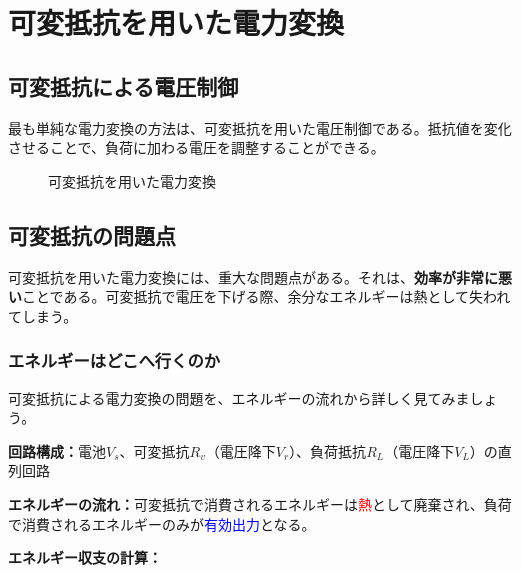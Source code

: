 \section{可変抵抗を用いた電力変換}

\subsection{可変抵抗による電圧制御}

最も単純な電力変換の方法は、可変抵抗を用いた電圧制御である。抵抗値を変化させることで、負荷に加わる電圧を調整することができる。

\begin{figure}[H]
\centering
{}
\caption{可変抵抗を用いた電力変換}
\label{fig:variable_resistor}
\end{figure}

\subsection{可変抵抗の問題点}

可変抵抗を用いた電力変換には、重大な問題点がある。それは、\textbf{効率が非常に悪い}ことである。可変抵抗で電圧を下げる際、余分なエネルギーは熱として失われてしまう。

\subsubsection{エネルギーはどこへ行くのか}

可変抵抗による電力変換の問題を、エネルギーの流れから詳しく見てみましょう。

\textbf{回路構成：}電池$V_s$、可変抵抗$R_v$（電圧降下$V_r$）、負荷抵抗$R_L$（電圧降下$V_L$）の直列回路

\textbf{エネルギーの流れ：}可変抵抗で消費されるエネルギーは\textcolor{red}{熱}として廃棄され、負荷で消費されるエネルギーのみが\textcolor{blue}{有効出力}となる。

\textbf{エネルギー収支の計算：}

